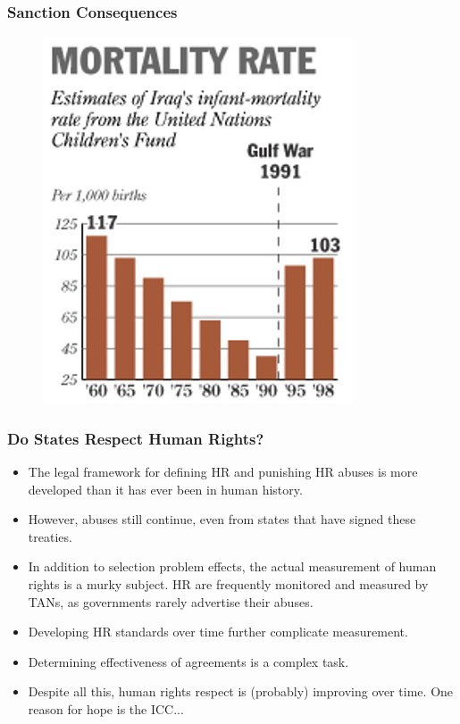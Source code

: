 \documentclass{beamer}
\begin{document}
\begin{frame} 
	\frametitle{\LARGE{Sanction Consequences}}
	\begin{figure}[ht!]
		\centering
		\includegraphics[width=\textwidth,height=0.8\textheight,keepaspectratio]{Iraqmortality.jpg}
	\end{figure}
\end{frame}

\begin{frame} 
	\frametitle{\LARGE{Do States Respect Human Rights?}}
	\begin{itemize}
		\item The legal framework for defining HR and punishing HR abuses is more developed than it has ever been in human history. \pause
		\item However, abuses still continue, even from states that have signed these treaties. \pause
		\item In addition to selection problem effects, the actual measurement of human rights is a murky subject. HR are frequently monitored and measured by TANs, as governments rarely advertise their abuses. \pause
		\item Developing HR standards over time further complicate measurement. \pause
		\item Determining effectiveness of agreements is a complex task. \pause
		\item Despite all this, human rights respect is (probably) improving over time. One reason for hope is the ICC...
		
		
	\end{itemize}
\end{frame}
\end{document}
